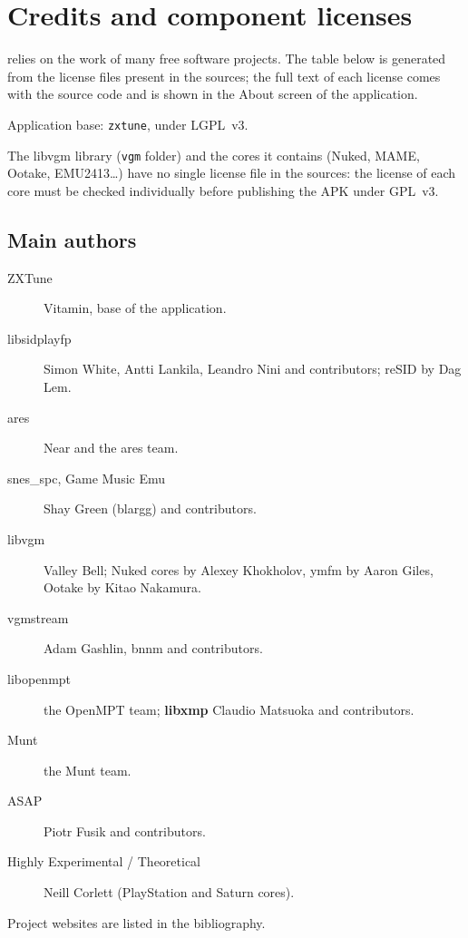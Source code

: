 \chapter{Credits and component licenses}\label{chap:credits}
\soft relies on the work of many free software projects. The table below is generated from the license files present
in the sources; the full text of each license comes with the source code and is shown in the About screen of the
application.

Application base: \texttt{zxtune}, under LGPL~v3.

The libvgm library (\texttt{vgm} folder) and the cores it contains (Nuked, MAME, Ootake, EMU2413\dots) have no single
license file in the sources: the license of each core must be checked individually before publishing the APK under
GPL~v3.

\section*{Main authors}
\begin{description}
  \item[ZXTune] Vitamin, base of the application.
  \item[libsidplayfp] Simon White, Antti Lankila, Leandro Nini and contributors; reSID by Dag Lem.
  \item[ares] Near and the ares team.
  \item[snes\_spc, Game Music Emu] Shay Green (blargg) and contributors.
  \item[libvgm] Valley Bell; Nuked cores by Alexey Khokholov, ymfm by Aaron Giles, Ootake by Kitao Nakamura.
  \item[vgmstream] Adam Gashlin, bnnm and contributors.
  \item[libopenmpt] the OpenMPT team; \textbf{libxmp} Claudio Matsuoka and contributors.
  \item[Munt] the Munt team.
  \item[ASAP] Piotr Fusik and contributors.
  \item[Highly Experimental / Theoretical] Neill Corlett (PlayStation and Saturn cores).
\end{description}
Project websites are listed in the bibliography.

